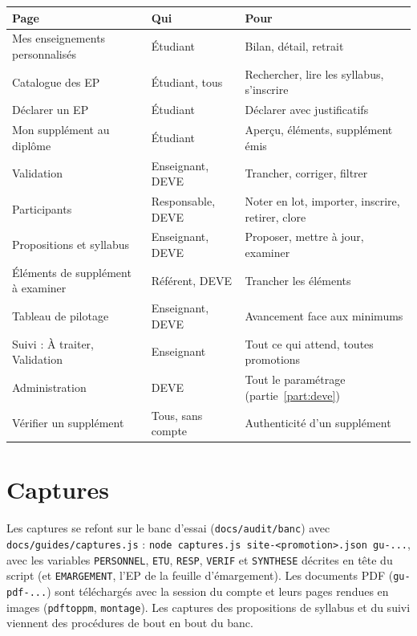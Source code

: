 \documentclass[11pt,a4paper]{article}
\begin{document}
\begin{center}
\small
\begin{tabularx}{\linewidth}{@{}l l X@{}}
\toprule
\textbf{Page} & \textbf{Qui} & \textbf{Pour} \\
\midrule
Mes enseignements personnalisés & Étudiant & Bilan, détail, retrait \\
Catalogue des EP & Étudiant, tous & Rechercher, lire les syllabus, s'inscrire \\
Déclarer un EP & Étudiant & Déclarer avec justificatifs \\
Mon supplément au diplôme & Étudiant & Aperçu, éléments, supplément émis \\
Validation & Enseignant, DEVE & Trancher, corriger, filtrer \\
Participants & Responsable, DEVE & Noter en lot, importer, inscrire, retirer, clore \\
Propositions et syllabus & Enseignant, DEVE & Proposer, mettre à jour, examiner \\
Éléments de supplément à examiner & Référent, DEVE & Trancher les éléments \\
Tableau de pilotage & Enseignant, DEVE & Avancement face aux minimums \\
Suivi : À traiter, Validation & Enseignant & Tout ce qui attend, toutes promotions \\
Administration & DEVE & Tout le paramétrage (partie~\ref{part:deve}) \\
Vérifier un supplément & Tous, sans compte & Authenticité d'un supplément \\
\bottomrule
\end{tabularx}
\end{center}

\section{Captures}

Les captures se refont sur le banc d'essai (\texttt{docs/audit/banc}) avec
\texttt{docs/guides/captures.js} : \texttt{node captures.js site-<promotion>.json gu-...},
avec les variables \texttt{PERSONNEL}, \texttt{ETU}, \texttt{RESP}, \texttt{VERIF} et
\texttt{SYNTHESE} décrites en tête du script (et \texttt{EMARGEMENT}, l'EP de la feuille
d'émargement). Les documents PDF (\texttt{gu-pdf-...}) sont téléchargés avec la session du
compte et leurs pages rendues en images (\texttt{pdftoppm}, \texttt{montage}). Les captures des
propositions de syllabus et du suivi viennent des procédures de bout en bout du banc.
\end{document}
